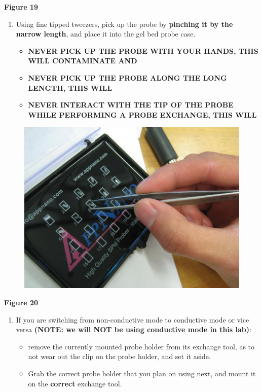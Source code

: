 \documentclass{../lab}
\begin{document}
\textbf{Figure 19}

\begin{enumerate}
    \item Using fine tipped tweezers, pick up the probe by \textbf{pinching it by the narrow length}, and place it into the gel bed probe case.
    \begin{itemize}
        \item \textbf{NEVER PICK UP THE PROBE WITH YOUR HANDS, THIS WILL CONTAMINATE AND }

        \item \textbf{NEVER PICK UP THE PROBE ALONG THE LONG LENGTH, THIS WILL }

        \item \textbf{NEVER INTERACT WITH THE TIP OF THE PROBE WHILE PERFORMING A PROBE EXCHANGE, THIS WILL }

    \end{itemize}

\end{enumerate}


\begin{figure}[h]
    \centering
    \href{http://dev-physicsadv.pantheon.berkeley.edu/sites/default/files/AFMImages/20.JPG}{\includegraphics[width=0.5\linewidth]{images/20.JPG}}
    \caption{}
    \label{fig:20}
\end{figure}

\textbf{Figure 20}

\begin{enumerate}
    \item If you are switching from non-conductive mode to conductive mode or vice versa\textbf{ (NOTE:  we will NOT be using conductive mode in this lab)}:
    \begin{itemize}
        \item remove the currently mounted probe holder from its exchange tool, as to not wear out the clip on the probe holder, and set it aside.

        \item Grab the correct probe holder that you plan on using next, and mount it on the \textbf{correct} exchange tool.

    \end{itemize}

\end{enumerate}
\end{document}
